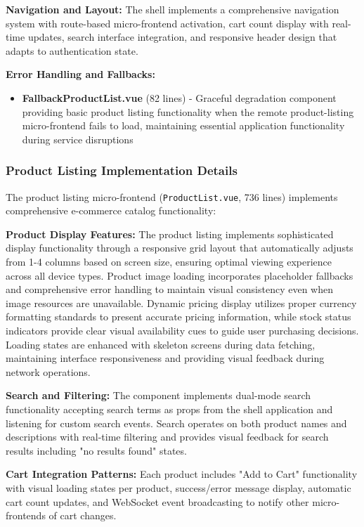 \documentclass[12pt,a4paper]{report}
\begin{document}
\textbf{Navigation and Layout:} The shell implements a comprehensive navigation system with route-based micro-frontend activation, cart count display with real-time updates, search interface integration, and responsive header design that adapts to authentication state.

\textbf{Error Handling and Fallbacks:}
\begin{itemize}
\item \textbf{FallbackProductList.vue} (82 lines) - Graceful degradation component providing basic product listing functionality when the remote product-listing micro-frontend fails to load, maintaining essential application functionality during service disruptions
\end{itemize}

\subsubsection{Product Listing Implementation Details}

The product listing micro-frontend (\texttt{ProductList.vue}, 736 lines) implements comprehensive e-commerce catalog functionality:

\textbf{Product Display Features:} The product listing implements sophisticated display functionality through a responsive grid layout that automatically adjusts from 1-4 columns based on screen size, ensuring optimal viewing experience across all device types. Product image loading incorporates placeholder fallbacks and comprehensive error handling to maintain visual consistency even when image resources are unavailable. Dynamic pricing display utilizes proper currency formatting standards to present accurate pricing information, while stock status indicators provide clear visual availability cues to guide user purchasing decisions. Loading states are enhanced with skeleton screens during data fetching, maintaining interface responsiveness and providing visual feedback during network operations.

\textbf{Search and Filtering:} The component implements dual-mode search functionality accepting search terms as props from the shell application and listening for custom search events. Search operates on both product names and descriptions with real-time filtering and provides visual feedback for search results including "no results found" states.

\textbf{Cart Integration Patterns:} Each product includes "Add to Cart" functionality with visual loading states per product, success/error message display, automatic cart count updates, and WebSocket event broadcasting to notify other micro-frontends of cart changes.
\end{document}
